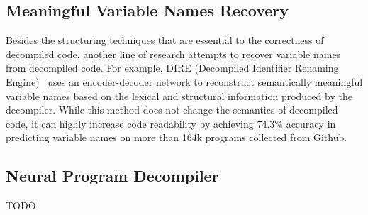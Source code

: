 \subsection{Meaningful Variable Names Recovery} \label{sec:existing-var-names}
Besides the structuring techniques that are essential to the correctness of decompiled code, another line of research attempts to recover variable names from decompiled code. For example, DIRE (Decompiled Identifier Renaming Engine)~\cite{lacomis2019dire} uses an encoder-decoder network to reconstruct semantically meaningful variable names based on the lexical and structural information produced by the decompiler. While this method does not change the semantics of decompiled code, it can highly increase code readability by achieving 74.3\% accuracy in predicting variable names on more than 164k programs collected from Github.

\subsection{Neural Program Decompiler} \label{sec:existing-neural-dec}
TODO

